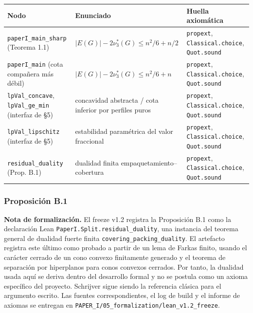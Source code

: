 \documentclass[spanish,11pt,a4paper]{article}
\newcounter{none}
\begin{document}
{\def\LTcaptype{none} %
\begin{longtable}[]{@{}
  >{\raggedright\arraybackslash}p{}
  >{\raggedright\arraybackslash}p{}
  >{\raggedright\arraybackslash}p{}@{}}
\toprule\noalign{}
\begin{minipage}[b]{\linewidth}\raggedright
Nodo
\end{minipage} & \begin{minipage}[b]{\linewidth}\raggedright
Enunciado
\end{minipage} & \begin{minipage}[b]{\linewidth}\raggedright
Huella axiomática
\end{minipage} \\
\midrule\noalign{}
\endhead
\bottomrule\noalign{}
\endlastfoot
\nolinkurl{paperI_main_sharp} (Teorema 1.1) &
\(\lvert E(G)\rvert-2\nu_3^*(G)\le n^2/6+n/2\) & \nolinkurl{propext},
\nolinkurl{Classical.choice}, \nolinkurl{Quot.sound} \\
\nolinkurl{paperI_main} (cota compañera más débil) &
\(\lvert E(G)\rvert-2\nu_3^*(G)\le n^2/6+n\) & \nolinkurl{propext},
\nolinkurl{Classical.choice}, \nolinkurl{Quot.sound} \\
\nolinkurl{lpVal_concave}, \nolinkurl{lpVal_ge_min} (interfaz de §5) &
concavidad abstracta / cota inferior por perfiles puros &
\nolinkurl{propext}, \nolinkurl{Classical.choice}, \nolinkurl{Quot.sound} \\
\nolinkurl{lpVal_lipschitz} (interfaz de §5) & estabilidad paramétrica del
valor fraccional & \nolinkurl{propext}, \nolinkurl{Classical.choice},
\nolinkurl{Quot.sound} \\
\nolinkurl{residual_duality} (Prop. B.1) & dualidad finita
empaquetamiento--cobertura & \nolinkurl{propext},
\nolinkurl{Classical.choice}, \nolinkurl{Quot.sound} \\
\end{longtable}
}

\subsubsection{Proposición B.1}\label{proposiciuxf3n-b.1}

\textbf{Nota de formalización.} El freeze v1.2 registra la Proposición
B.1 como la declaración Lean \nolinkurl{PaperI.Split.residual_duality},
una instancia del teorema general de dualidad fuerte finita
\nolinkurl{covering_packing_duality}. El artefacto registra este último
como probado a partir de un lema de Farkas finito, usando el carácter
cerrado de un cono convexo finitamente generado y el teorema de
separación por hiperplanos para conos convexos cerrados. Por tanto, la
dualidad usada aquí se deriva dentro del desarrollo formal y no se
postula como un axioma específico del proyecto. Schrijver sigue siendo
la referencia clásica para el argumento escrito. Las fuentes
correspondientes, el log de build y el informe de axiomas se entregan en
\nolinkurl{PAPER_I/05_formalization/lean_v1.2_freeze}.
\end{document}
